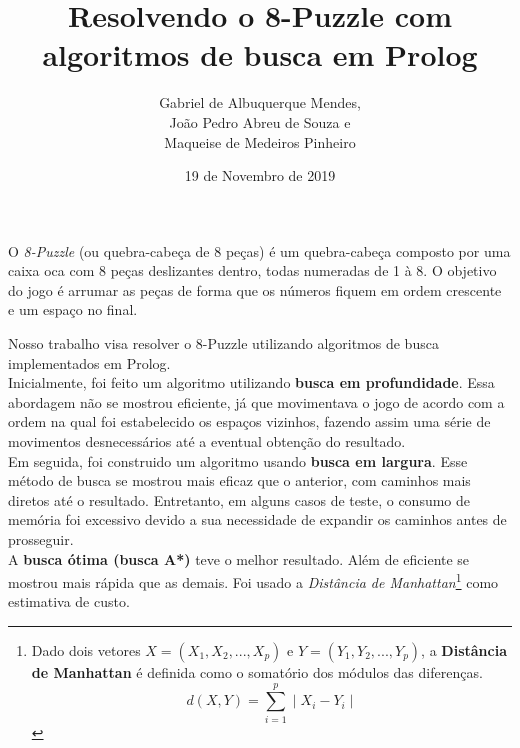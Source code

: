 \documentclass[12pt,a4paper]{article}
\author{Gabriel de Albuquerque Mendes,\\
 João Pedro Abreu de Souza e \\
 Maqueise de Medeiros Pinheiro}
\title{Resolvendo o 8-Puzzle com algoritmos de busca em Prolog}
\date{19 de Novembro de 2019}
\begin{document}
\maketitle
O \textit{8-Puzzle} (ou quebra-cabeça de 8 peças) é um quebra-cabeça composto por uma caixa oca com 8 peças deslizantes dentro, todas numeradas de 1 à 8. O objetivo do jogo é arrumar as peças de forma que os números fiquem em ordem crescente e um espaço no final.

Nosso trabalho visa resolver o 8-Puzzle utilizando algoritmos de busca implementados em Prolog.
\\

Inicialmente, foi feito um algoritmo utilizando \textbf{busca em profundidade}. Essa abordagem não se mostrou eficiente, já que movimentava o jogo de acordo com a ordem na qual foi estabelecido os espaços vizinhos, fazendo assim uma série de movimentos desnecessários até a eventual obtenção do resultado.
\\

Em seguida, foi construido um algoritmo usando \textbf{busca em largura}. Esse método de busca se mostrou mais eficaz que o anterior, com caminhos mais diretos até o resultado. Entretanto, em alguns casos de teste, o consumo de memória foi excessivo devido a sua necessidade de expandir os caminhos antes de prosseguir.
\\

A \textbf{busca ótima (busca A*)} teve o melhor resultado. Além de eficiente se mostrou mais rápida que as demais. Foi usado a \textit{Distância de Manhattan}\footnote{Dado dois vetores $X=(X_1,X_2,...,X_p)$ e $Y=(Y_1,Y_2,...,Y_p)$, a \textbf{Distância de Manhattan} é definida como o somatório dos módulos das diferenças. $$d(X,Y)= \sum_{i=1}^{p} \mid X_i - Y_i \mid$$} como estimativa de custo.
\end{document}

